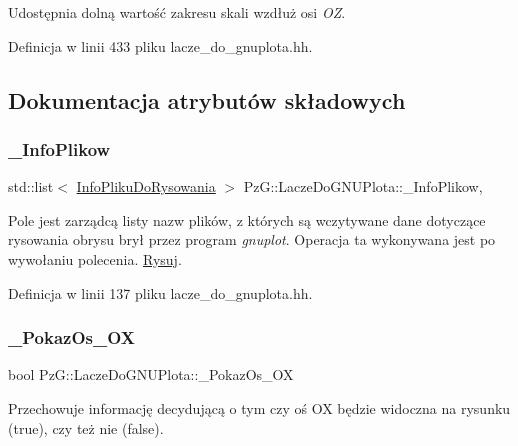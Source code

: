 Udostępnia dolną wartość zakresu skali wzdłuż osi {\itshape OZ}. 

Definicja w linii 433 pliku lacze\+\_\+do\+\_\+gnuplota.\+hh.



\subsection{Dokumentacja atrybutów składowych}
\mbox{\label{class_pz_g_1_1_lacze_do_g_n_u_plota_a1916c5a6fecfb3554e9d5204b2f2086c}} 
\subsubsection{\texorpdfstring{\_InfoPlikow}{\_InfoPlikow}}
{\footnotesize\ttfamily std\+::list$<$ \mbox{\hyperlink{class_pz_g_1_1_info_pliku_do_rysowania}{Info\+Pliku\+Do\+Rysowania}} $>$ Pz\+G\+::\+Lacze\+Do\+G\+N\+U\+Plota\+::\+\_\+\+Info\+Plikow\hspace{0.3cm}{\ttfamily [static]}, {\ttfamily [protected]}}

Pole jest zarządcą listy nazw plików, z których są wczytywane dane dotyczące rysowania obrysu brył przez program {\itshape gnuplot}. Operacja ta wykonywana jest po wywołaniu polecenia. \mbox{\hyperlink{class_pz_g_1_1_lacze_do_g_n_u_plota_a065f5b8402737cc62b0ad4f66d028335}{Rysuj}}. 

Definicja w linii 137 pliku lacze\+\_\+do\+\_\+gnuplota.\+hh.

\mbox{\label{class_pz_g_1_1_lacze_do_g_n_u_plota_a833aa8994b9913786f920ec8c259731f}} 
\subsubsection{\texorpdfstring{\_PokazOs\_OX}{\_PokazOs\_OX}}
{\footnotesize\ttfamily bool Pz\+G\+::\+Lacze\+Do\+G\+N\+U\+Plota\+::\+\_\+\+Pokaz\+Os\+\_\+\+OX\hspace{0.3cm}{\ttfamily [protected]}}

Przechowuje informację decydującą o tym czy oś OX będzie widoczna na rysunku ({\ttfamily true}), czy też nie ({\ttfamily false}). 

